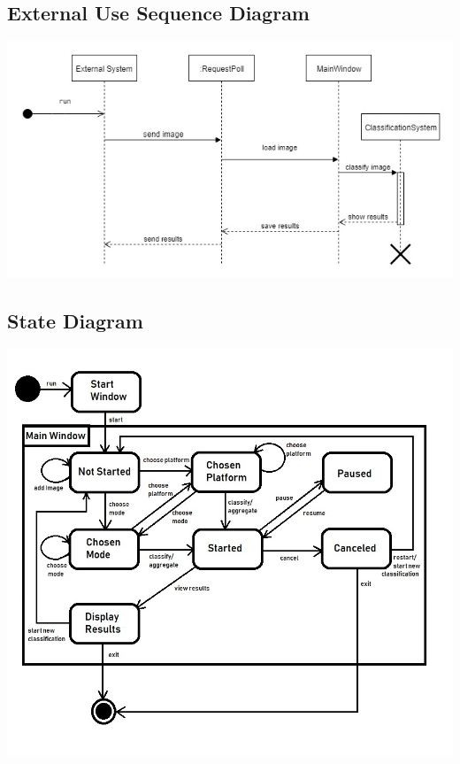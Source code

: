 \documentclass[parskip=full]{scrartcl}
\begin{document}
\pagebreak

\subsection {External Use Sequence Diagram}

\begin{center}
\includegraphics[width=1.0\textwidth]{Untitled Diagram.jpg}
\end{center}

\pagebreak

\subsection {State Diagram}

\begin{center}
\includegraphics[width=1.0\textwidth]{StateDiag.jpg}
\end{center}

\pagebreak
\end{document}
